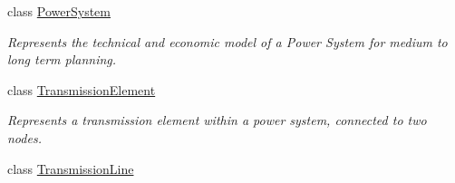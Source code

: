 \begin{DoxyCompactItemize}
class \hyperlink{class_power_system_planning_1_1_power_system}{Power\+System}
\begin{DoxyCompactList}\small\item\em Represents the technical and economic model of a Power System for medium to long term planning. \end{DoxyCompactList}\item 
class \hyperlink{class_power_system_planning_1_1_transmission_element}{Transmission\+Element}
\begin{DoxyCompactList}\small\item\em Represents a transmission element within a power system, connected to two nodes. \end{DoxyCompactList}\item 
class \hyperlink{class_power_system_planning_1_1_transmission_line}{Transmission\+Line}
\end{DoxyCompactItemize}
